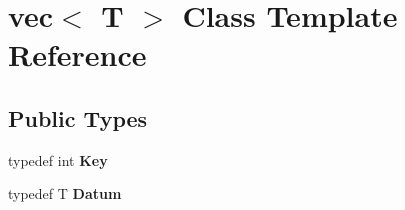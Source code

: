 \hypertarget{classvec}{\section{vec$<$ \-T $>$ \-Class \-Template \-Reference}
\label{classvec}
}
\subsection*{\-Public \-Types}
\begin{DoxyCompactItemize}
\item 
\hypertarget{classvec_a2534b2a9d2c8aaa686a0fd9ffbba2b74}{typedef int {\bfseries \-Key}}\label{classvec_a2534b2a9d2c8aaa686a0fd9ffbba2b74}

\item 
\hypertarget{classvec_acf60a9a9f8b3c0bb7562ad00076485c6}{typedef \-T {\bfseries \-Datum}}\label{classvec_acf60a9a9f8b3c0bb7562ad00076485c6}

\end{DoxyCompactItemize}
